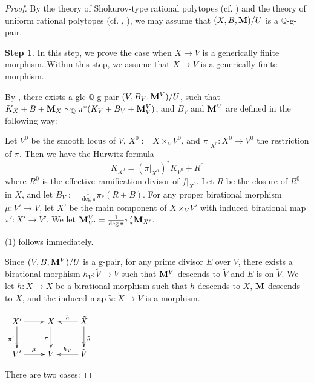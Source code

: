 \documentclass[11pt]{amsart}
\numberwithin{equation}{section}
\newcommand{\Mm}{{\bf{M}}}
\newcommand{\Qq}{\mathbb{Q}}
\theoremstyle{definition}
\theoremstyle{definition}
\theoremstyle{definition}
\begin{document}
\begin{proof}
By the theory of Shokurov-type rational polytopes (cf. \cite[Proposition 3.16]{HL18}) and the theory of uniform rational polytopes (cf. \cite[Lemma 5.3]{HLS19}, \cite[Therem 1.4]{Che20}), we may assume that $(X,B,\Mm)/U$ is a $\Qq$-g-pair. 

\medskip

\noindent\textbf{Step 1}. In this step, we prove the case when $X\rightarrow V$ is a generically finite morphism. Within this step, we assume that $X\rightarrow V$ is a generically finite morphism.

By \cite[Theorem 4.5, (4.3),(4.4)]{HL20}, there exists a glc $\Qq$-g-pair $(V,B_V,\Mm^V)/U$, such that $K_X+B+\Mm_X\sim_{\mathbb Q}\pi^*(K_V+B_V+\Mm^V_V)$, and $B_V$ and $\Mm^V$ are defined in the following way: 

Let $V^0$ be the smooth locus of $V$, $X^0:=X\times_VV^0$, and $\pi|_{X^0}: X^0\rightarrow V^0$ the restriction of $\pi$. Then we have the Hurwitz formula
$$K_{X^0}=(\pi|_{X^0})^*K_{V^0}+R^0$$
where $R^0$ is the effective ramification divisor of $f|_{X^0}$. Let $R$ be the closure of $R^0$ in $X$, and let $B_V:=\frac{1}{\deg \pi}\pi_*(R+B)$. For any proper birational morphism $\mu: V'\rightarrow V$, let $X'$ be the main component of $X\times_VV'$ with induced birational map $\pi': X'\rightarrow V'$. We let $\Mm^V_{V'}=\frac{1}{\deg\pi}\pi'_*\Mm_{X'}$.

(1) follows immediately. 

Since $(V,B,\Mm^V)/U$ is a g-pair, for any prime divisor $E$ over $V$, there exists a birational morphism $h_V: \tilde V\rightarrow V$ such that $\Mm^V$ descends to $\tilde V$ and $E$ is on $\tilde V$. We let $h: \tilde X\rightarrow X$ be a birational morphism such that $h$ descends to $\tilde X$, $\Mm$ descends to $\tilde X$, and the induced map $\tilde\pi: \tilde X\rightarrow\tilde V$ is a  morphism. 
\begin{center}$\xymatrix{
X'\ar@{->}[d]_{\pi'}\ar@{->}[r]& X\ar@{->}[d]_{\pi} & \tilde X\ar@{->}[l]_{h}\ar@{->}[d]^{\tilde\pi}\\
V'\ar@{->}[r]^{\mu}& V & \tilde V\ar@{->}[l]_{h_V}
}$
\end{center}
There are two cases:

\medskip


\end{proof}
\end{document}
